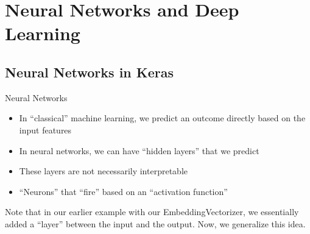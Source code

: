 \section{Neural Networks and Deep Learning}



\subsection[Neural networks]{Neural Networks in Keras}




\begin{frame}{Neural Networks}
	\begin{itemize}
		\item In ``classical'' machine learning, we predict an outcome directly based on the input features
		\item In neural networks, we can have ``hidden layers'' that we predict
		\item These layers are not necessarily interpretable
		\item ``Neurons'' that ``fire'' based on an ``activation function''
	\end{itemize}
	
\end{frame}


\begin{frame}[standout]
Note that in our earlier example with our EmbeddingVectorizer, we essentially added a ``layer'' between the input and the output. Now, we generalize this idea.

\end{frame}

